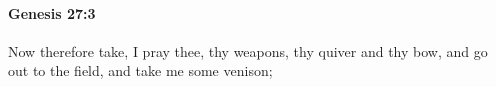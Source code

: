 
		\paragraph{Genesis 27:3} %
			\label{GENESIS-27-3}

			Now therefore take, I pray thee, thy weapons, thy quiver and thy bow, and go out to the field, and take me some venison;


